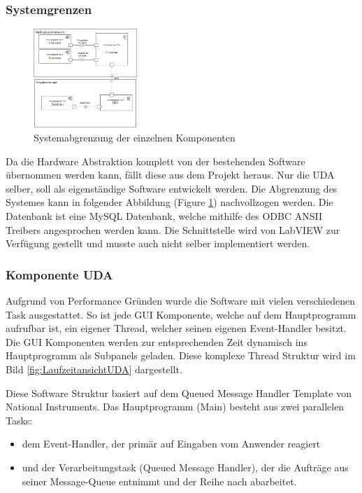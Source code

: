 \documentclass[10pt]{scrartcl}
\begin{document}
\subsubsection{Systemgrenzen}
\begin{figure}
	\begin{center}
		\includegraphics[width=0.35\textwidth]{pictures/Systemgrenzen}
		\caption{Systemabgrenzung der einzelnen Komponenten}
		\label{fig:SystemView}			
	\end{center}
\end{figure}
Da die Hardware Abstraktion komplett von der bestehenden Software übernommen werden kann, fällt diese aus dem Projekt heraus. Nur die UDA selber, soll als eigenständige Software entwickelt werden. Die Abgrenzung des Systemes kann in folgender Abbildung (Figure \ref{fig:SystemView}) nachvollzogen werden.
 Die Datenbank ist eine MySQL Datenbank, welche mithilfe des ODBC ANSII Treibers angesprochen werden kann. Die Schnittstelle wird von \gls{LabVIEW} zur Verfügung gestellt und musste auch nicht selber implementiert werden.
\subsubsection{Komponente UDA}
Aufgrund von Performance Gründen wurde die Software mit vielen verschiedenen Task ausgestattet. So ist jede GUI Komponente, welche auf dem Hauptprogramm aufrufbar ist, ein eigener Thread,  welcher seinen eigenen Event-Handler besitzt. Die GUI Komponenten werden zur entsprechenden Zeit dynamisch ins Hauptprogramm als Subpanels geladen. Diese komplexe Thread Struktur wird im Bild \ref{fig:LaufzeitansichtUDA} dargestellt.

Diese Software Struktur basiert auf dem Queued Message Handler Template von National Instruments.
Das Hauptprogramm (Main) besteht aus zwei parallelen Tasks:
\begin{itemize}
	\item dem Event-Handler, der primär auf Eingaben vom Anwender reagiert
	\item und der Verarbeitungstask (Queued Message Handler), der die Aufträge aus seiner Message-Queue entnimmt und der Reihe nach abarbeitet.
\end{itemize}
\end{document}
